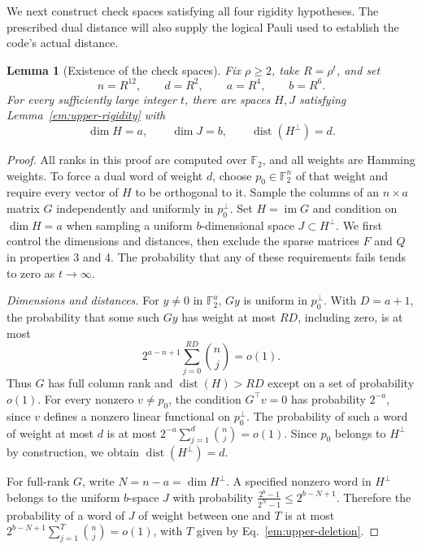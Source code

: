\documentclass[aps,prl,reprint,notitlepage,nofootinbib,nobibnotes]{revtex4-2}
\newtheorem{lemma}{Lemma}
\begin{document}
We next construct check spaces satisfying all four rigidity hypotheses. The prescribed dual
distance will also supply the logical Pauli used to establish the code's actual distance.

\begin{lemma}[Existence of the check spaces]
\label{em:upper-existence}
Fix $\rho\ge2$, take $R=\rho^t$, and set
\begin{equation}\label{em:upper-parameters}
 n=R^{12},\qquad d=R^2,\qquad a=R^4,\qquad b=R^6.
\end{equation}
For every sufficiently large integer $t$, there are spaces $H,J$ satisfying
Lemma~\ref{em:upper-rigidity} with
\[
 \dim H=a,\qquad \dim J=b,\qquad
 \operatorname{dist}(H^\perp)=d.
\]
\end{lemma}

\begin{proof}
All ranks in this proof are computed over $\mathbb F_2$, and all weights are Hamming weights. To
force a dual word of weight $d$, choose $p_0\in\mathbb F_2^n$ of that weight and require every
vector of $H$ to be orthogonal to it. Sample the columns of an $n\times a$ matrix $G$ independently
and uniformly in $p_0^\perp$. Set $H=\operatorname{im}G$ and condition on $\dim H=a$ when sampling
a uniform $b$-dimensional space $J\subset H^\perp$. We first control the dimensions and distances,
then exclude the sparse matrices $F$ and $Q$ in properties 3 and 4. The probability that any of
these requirements fails tends to zero as $t\to\infty$.

\emph{Dimensions and distances.}
For $y\ne0$ in $\mathbb F_2^a$, $Gy$ is uniform in $p_0^\perp$. With $D=a+1$, the probability that
some such $Gy$ has weight at most $RD$, including zero, is at most
\[
 2^{a-n+1}\sum_{j=0}^{RD}\binom nj=o(1).
\]
Thus $G$ has full column rank and $\operatorname{dist}(H)>RD$ except on a set of probability
$o(1)$. For every nonzero $v\ne p_0$, the condition $G^\top v=0$ has probability $2^{-a}$, since
$v$ defines a nonzero linear functional on $p_0^\perp$. The probability of such a word of weight at
most $d$ is at most $2^{-a}\sum_{j=1}^{d}\binom nj=o(1)$. Since $p_0$ belongs to $H^\perp$ by
construction, we obtain $\operatorname{dist}(H^\perp)=d$.

For full-rank $G$, write $N=n-a=\dim H^\perp$. A specified nonzero word in $H^\perp$ belongs to the
uniform $b$-space $J$ with probability $\frac{2^b-1}{2^N-1}\le2^{b-N+1}$. Therefore the probability
of a word of $J$ of weight between one and $T$ is at most $2^{b-N+1}\sum_{j=1}^{T}\binom nj=o(1)$,
with $T$ given by Eq.~\eqref{em:upper-deletion}.


\end{proof}
\end{document}
